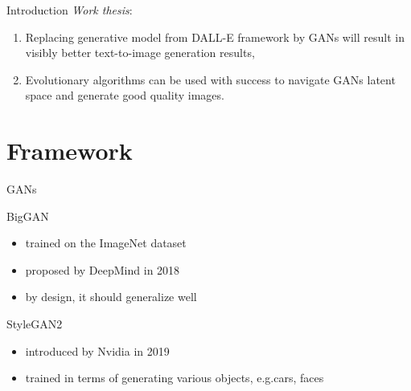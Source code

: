 \documentclass[t]{beamer}
\begin{document}
\begin{frame}{Introduction}
\textit{Work thesis}:
\begin{enumerate}
\item Replacing generative model from DALL-E framework by GANs will result in visibly better text-to-image generation results, \newline
\item  Evolutionary algorithms can be used with success to navigate GANs latent space and generate good quality images.
\end{enumerate}
\end{frame}

\section{Framework}


\begin{frame}[c]{GANs}
\begin{block}{BigGAN}
\begin{itemize}
\item trained on the ImageNet dataset
\item proposed by DeepMind in 2018
\item by design, it should generalize well
\end{itemize}
\end{block}
\begin{block}{StyleGAN2}
\begin{itemize}
\item introduced by Nvidia in 2019
\item trained in terms of generating various objects, e.g.cars, faces
\end{itemize}
\end{block}
\end{frame}
\end{document}
